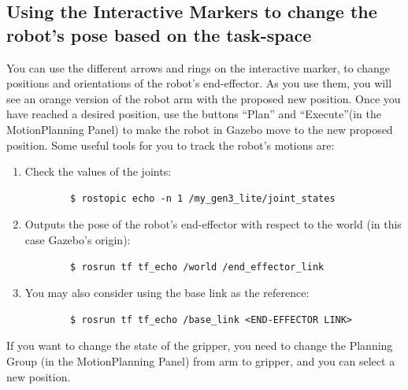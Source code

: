 \documentclass[12pt]{article}
\begin{document}
\subsection{Using the Interactive Markers to change the robot’s pose based on the task-space}


You can use the different arrows and rings on the interactive marker, to change positions and orientations of the robot’s end-effector. As you use them, you will see an orange version of the robot arm with the proposed new position. Once you have reached a desired position, use the buttons “Plan” and “Execute”(in the MotionPlanning Panel) to make the robot in Gazebo move to the new proposed position. Some useful tools for you to track the robot’s motions are:

\begin{enumerate}
    \item Check the values of the joints:
        \begin{verbatim}
        $ rostopic echo -n 1 /my_gen3_lite/joint_states
        \end{verbatim}
    \item Outputs the pose of the robot’s end-effector with respect to the world (in this case Gazebo’s origin):

        \begin{verbatim}
        $ rosrun tf tf_echo /world /end_effector_link
        \end{verbatim}

    \item You may also consider using the base link as the reference:
        \begin{verbatim}
        $ rosrun tf tf_echo /base_link <END-EFFECTOR LINK>
        \end{verbatim}
\end{enumerate}    
If you want to change the state of the gripper, you need to change the Planning Group (in the MotionPlanning Panel) from arm to gripper, and you can select a new position.
\\
\end{document}
